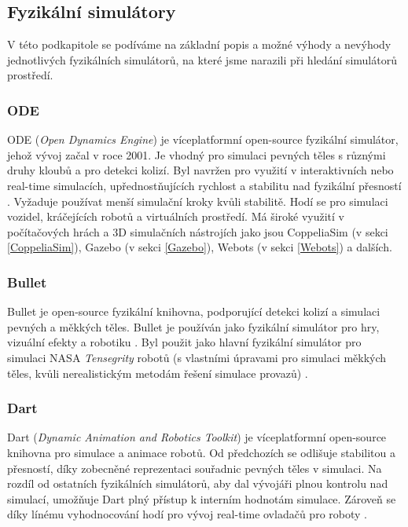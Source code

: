 \subsection{Fyzikální simulátory} \label{Simulované prostředí - f simulátory}

V této podkapitole se podíváme na základní popis a možné výhody a nevýhody
jednotlivých fyzikálních simulátorů, na které jsme narazili při hledání
simulátorů prostředí.

\subsubsection{ODE} \label{ODE}
ODE (\emph{Open Dynamics Engine}) \citep{opendynamicsengine} je víceplatformní
open-source fyzikální simulátor, jehož vývoj začal v roce 2001. Je vhodný pro
simulaci pevných těles s různými druhy kloubů a pro detekci kolizí. Byl navržen
pro využití v interaktivních nebo real-time simulacích, upřednostňujících
rychlost a stabilitu nad fyzikální přesností \citep{smith2007open}. Vyžaduje
používat menší simulační kroky kvůli stabilitě. Hodí se pro simulaci vozidel,
kráčejících robotů a virtuálních prostředí. Má široké využití v počítačových
hrách a 3D simulačních nástrojích jako jsou CoppeliaSim (v sekci
\ref{CoppeliaSim}), Gazebo (v sekci \ref{Gazebo}), Webots (v sekci
\ref{Webots}) a dalších.

\subsubsection{Bullet} \label{Bullet}
Bullet je open-source fyzikální knihovna, podporující detekci kolizí a simulaci
pevných a měkkých těles. Bullet je používán jako fyzikální simulátor pro hry,
vizuální efekty a robotiku \citep{coumans}. Byl použit jako hlavní fyzikální
simulátor pro simulaci NASA \emph{Tensegrity} robotů (s vlastními úpravami pro
simulaci měkkých těles, kvůli nerealistickým metodám řešení simulace provazů)
\citep{izadi2018simulating}.

\subsubsection{Dart} \label{Dart}
Dart (\emph{Dynamic Animation and Robotics Toolkit}) je víceplatformní
open-source knihovna pro simulace a animace robotů. Od předchozích se odlišuje
stabilitou a přesností, díky zobecněné reprezentaci souřadnic pevných těles v
simulaci. Na rozdíl od ostatních fyzikálních simulátorů, aby dal vývojáři plnou
kontrolu nad simulací, umožňuje Dart plný přístup k interním hodnotám simulace.
Zároveň se díky línému vyhodnocování hodí pro vývoj real-time ovladačů pro
roboty \citep{lee2018dart}.

